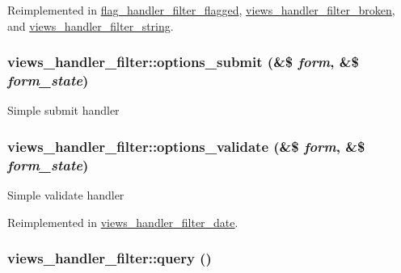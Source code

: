 Reimplemented in \hyperlink{classflag__handler__filter__flagged_705ed46853eba0fb4b4eb461de5264db}{flag\_\-handler\_\-filter\_\-flagged}, \hyperlink{classviews__handler__filter__broken_51fc714b7aec668a035da8dfb4b4a69a}{views\_\-handler\_\-filter\_\-broken}, and \hyperlink{classviews__handler__filter__string_997cbe831f362c6d83a72b84471567fa}{views\_\-handler\_\-filter\_\-string}.\hypertarget{classviews__handler__filter_d93c8118dcd40fc5194a806e2986a300}{
\subsubsection[{options\_\-submit}]{\setlength{\rightskip}{0pt plus 5cm}views\_\-handler\_\-filter::options\_\-submit (\&\$ {\em form}, \/  \&\$ {\em form\_\-state})}}
\label{classviews__handler__filter_d93c8118dcd40fc5194a806e2986a300}


Simple submit handler \hypertarget{classviews__handler__filter_1156751e912662ce47ad680cbe2c03a3}{
\subsubsection[{options\_\-validate}]{\setlength{\rightskip}{0pt plus 5cm}views\_\-handler\_\-filter::options\_\-validate (\&\$ {\em form}, \/  \&\$ {\em form\_\-state})}}
\label{classviews__handler__filter_1156751e912662ce47ad680cbe2c03a3}


Simple validate handler 

Reimplemented in \hyperlink{classviews__handler__filter__date_6d4e05f04a0f9ea5663f165777f54003}{views\_\-handler\_\-filter\_\-date}.\hypertarget{classviews__handler__filter_8e513b3abbc2559f37b550ca4957b4ae}{
\subsubsection[{query}]{\setlength{\rightskip}{0pt plus 5cm}views\_\-handler\_\-filter::query ()}}
\label{classviews__handler__filter_8e513b3abbc2559f37b550ca4957b4ae}


